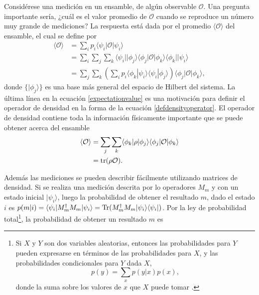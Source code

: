 Considérese una medición en un ensamble, de algún observable $\mathcal{O}$. Una
pregunta importante sería, ¿cuál es el valor promedio de $\mathcal{O}$ cuando
se reproduce un número muy grande de mediciones? La respuesta está dada por el
promedio $\langle \mathcal{O} \rangle$ del ensamble, el cual se define por
{\cite{sakurai2017modern}} \begin{equation}
 	\label{expectationvalue}
 	 \begin{split}
 		\langle \mathcal{O} \rangle &= \sum_{i}p_i \langle\psi_i|\mathcal{O}|\psi_i\rangle\\
 		&=\sum_i\sum_{j}\sum_k \langle\psi_i||\phi_j\rangle \langle \phi_j|\mathcal{O}|\phi_k\rangle \langle \phi_k||\psi_i\rangle\\
 		&=\sum_{j}\sum_k \left(\sum_{i} p_i \langle \phi_k|\psi_i\rangle  \langle\psi_i|\phi_j\rangle\right) \langle \phi_j|\mathcal{O}|\phi_k\rangle, 
 	\end{split}
\end{equation} donde $\{|\phi_j\rangle \}$ es una base más general del espacio de Hilbert del sistema. La última línea en la ecuación {\ref{expectationvalue}} es una
motivación para  definir el operador de densidad  en la forma de la ecuación
{\ref{defdensityoperator}}. El operador de densidad contiene toda la
información físicamente importante que se puede obtener acerca del ensamble
{\cite{sakurai2017modern}}\begin{equation}
 	\label{expectationvalue_traza}
 	\begin{split}
 		\langle \mathcal{O} \rangle &=\sum_{j}\sum_k \langle \phi_k|\rho|\phi_j\rangle \langle \phi_j|\mathcal{O}|\phi_k\rangle\\
 		&= \rm{tr}(\rho \mathcal{O}).
 	\end{split}
\end{equation}

Además las mediciones se pueden describir fácilmente utilizando matrices de densidad. Si se realiza una medición descrita por lo operadores $M_m$ y con un estado inicial $|\psi_i\rangle$, luego la probabilidad de obtener el resultado $m$, dado el estado $i$ es $p(m|i)=\langle \psi_i|M_m^{\dagger}M_m|\psi_i\rangle = {\rm Tr}(M_m^{\dagger} M_m |\psi_i\rangle \langle\psi_i|)$. Por la ley de probabilidad total\footnote{Si  $X$ y $Y$ son dos variables aleatorias, entonces las probabilidades para $Y $ pueden expresarse en términos de las probabilidades para $X$, y las probabilidades condicionales para $ Y$ dada $X$,
		\[p(y) =\sum_x p(y|x)p(x),\] donde la suma sobre los valores de $x$ que $X$ puede tomar {\cite{nielsen_chuang_2010}}.}, la probabilidad de obtener un resultado $m$ es {\cite{nielsen_chuang_2010}}

